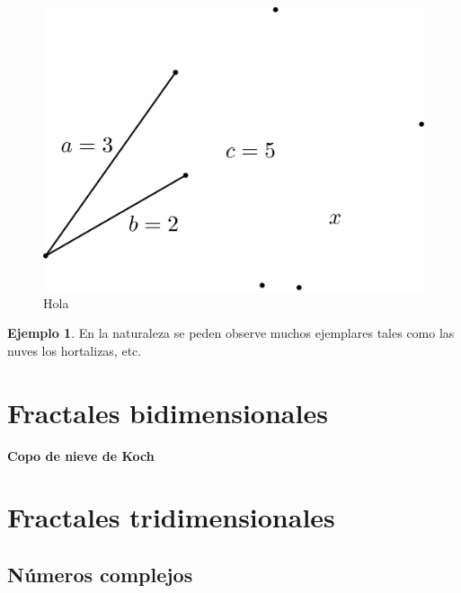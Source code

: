 \documentclass[
  11pt,
]{krantz}
\theoremstyle{definition}
\theoremstyle{definition}
\newtheorem{example}{Ejemplo}[chapter]
\theoremstyle{definition}
\theoremstyle{definition}
\theoremstyle{remark}
\begin{document}
\begin{figure}[!ht]

{\centering \includegraphics[width=1\linewidth]{proporcion} 

}

\caption{Hola}\label{fig:Doge}
\end{figure}

\begin{example}
\protect\hypertarget{exm:unnamed-chunk-4}{}\label{exm:unnamed-chunk-4}En la naturaleza se peden observe muchos ejemplares tales como las nuves los hortalizas, etc.
\end{example}

\hypertarget{fractales-bidimensionales}{%
\section{Fractales bidimensionales}\label{fractales-bidimensionales}}

\textbf{Copo de nieve de Koch}

\hypertarget{fractales-tridimensionales}{%
\section{Fractales tridimensionales}\label{fractales-tridimensionales}}

\hypertarget{nuxfameros-complejos}{%
\subsection{Números complejos}\label{nuxfameros-complejos}}
\end{document}
